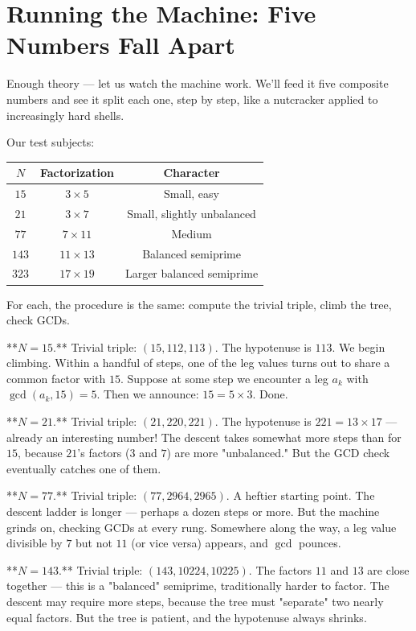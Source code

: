 \bigskip

\section*{Running the Machine: Five Numbers Fall Apart}

Enough theory --- let us watch the machine work. We'll feed it five composite numbers and see it split each one, step by step, like a nutcracker applied to increasingly hard shells.

Our test subjects:

\begin{center}
\small
\begin{tabular}{c c c}
\toprule
$N$ & Factorization & Character \\
\midrule
$15$ & $3 \times 5$ & Small, easy \\
$21$ & $3 \times 7$ & Small, slightly unbalanced \\
$77$ & $7 \times 11$ & Medium \\
$143$ & $11 \times 13$ & Balanced semiprime \\
$323$ & $17 \times 19$ & Larger balanced semiprime \\
\bottomrule
\end{tabular}
\end{center}

For each, the procedure is the same: compute the trivial triple, climb the tree, check GCDs.

**$N = 15$.**
Trivial triple: $(15, 112, 113)$. The hypotenuse is $113$. We begin climbing. Within a handful of steps, one of the leg values turns out to share a common factor with $15$. Suppose at some step we encounter a leg $a_k$ with $\gcd(a_k, 15) = 5$. Then we announce: $15 = 5 \times 3$. Done.

**$N = 21$.**
Trivial triple: $(21, 220, 221)$. The hypotenuse is $221 = 13 \times 17$ --- already an interesting number! The descent takes somewhat more steps than for $15$, because $21$'s factors ($3$ and $7$) are more "unbalanced." But the GCD check eventually catches one of them.

**$N = 77$.**
Trivial triple: $(77, 2964, 2965)$. A heftier starting point. The descent ladder is longer --- perhaps a dozen steps or more. But the machine grinds on, checking GCDs at every rung. Somewhere along the way, a leg value divisible by $7$ but not $11$ (or vice versa) appears, and $\gcd$ pounces.

**$N = 143$.**
Trivial triple: $(143, 10224, 10225)$. The factors $11$ and $13$ are close together --- this is a "balanced" semiprime, traditionally harder to factor. The descent may require more steps, because the tree must "separate" two nearly equal factors. But the tree is patient, and the hypotenuse always shrinks.

